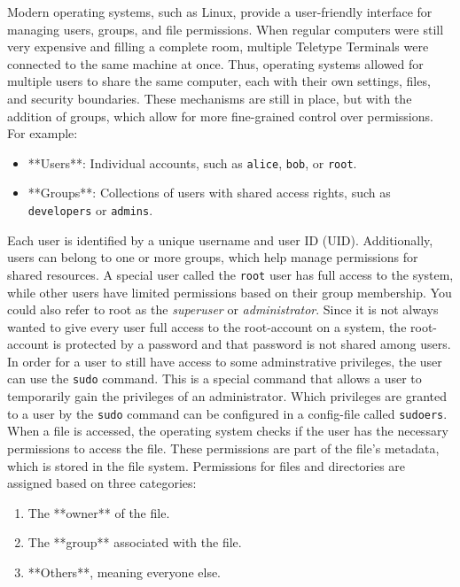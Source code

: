 
\begin{challenge}

    \begin{chadescription}
        Modern operating systems, such as Linux, provide a user-friendly interface for managing users, groups, and file permissions.
        When regular computers were still very expensive and filling a complete room, multiple Teletype Terminals were connected to the same machine at once.
        Thus, operating systems allowed for multiple users to share the same computer, each with their own settings, files, and security boundaries.
        These mechanisms are still in place, but with the addition of groups, which allow for more fine-grained control over permissions.
        For example:
        \begin{itemize}
            \item **Users**: Individual accounts, such as \texttt{alice}, \texttt{bob}, or \texttt{root}.
            \item **Groups**: Collections of users with shared access rights, such as \texttt{developers} or \texttt{admins}.
        \end{itemize}
        Each user is identified by a unique username and user ID (UID). 
        Additionally, users can belong to one or more groups, which help manage permissions for shared resources.
        A special user called the \texttt{root} user has full access to the system, while other users have limited permissions based on their group membership.
        You could also refer to root as the \textit{superuser} or \textit{administrator}.
        Since it is not always wanted to give every user full access to the root-account on a system, the root-account is protected by a password and that password is not shared among users.
        In order for a user to still have access to some adminstrative privileges, the user can use the \texttt{sudo} command.
        This is a special command that allows a user to temporarily gain the privileges of an administrator.
        Which privileges are granted to a user by the \texttt{sudo} command can be configured in a config-file called \texttt{sudoers}.\\
        When a file is accessed, the operating system checks if the user has the necessary permissions to access the file.
        These permissions are part of the file's metadata, which is stored in the file system.
        Permissions for files and directories are assigned based on three categories:
        \begin{enumerate}
            \item The **owner** of the file.
            \item The **group** associated with the file.
            \item **Others**, meaning everyone else.
        \end{enumerate}


\end{chadescription}
\end{challenge}
